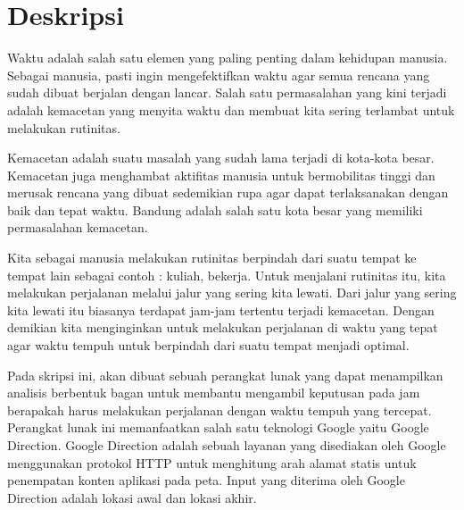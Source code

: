 \documentclass[a4paper,twoside]{article}
\begin{document}
\title{\@judultopik}
\author{\nama \textendash \@npm} 

\newcommand{\nama}{Frasetiawan Hidayat}
\newcommand{\@npm}{2010730121}
\newcommand{\@judultopik}{Analisis Waktu Tempuh Kota Bandung} %
\newcommand{\jumpemb}{1} %
\newcommand{\tanggal}{16/01/2017}
\maketitle


\section{Deskripsi}
Waktu adalah salah satu elemen yang paling penting dalam kehidupan manusia. Sebagai manusia, pasti ingin mengefektifkan waktu agar semua rencana yang sudah dibuat berjalan dengan lancar. Salah satu permasalahan yang kini terjadi adalah kemacetan yang menyita waktu dan membuat kita sering terlambat untuk melakukan rutinitas.

Kemacetan adalah suatu masalah yang sudah lama terjadi di kota-kota besar. Kemacetan juga menghambat aktifitas manusia untuk bermobilitas tinggi dan merusak rencana yang dibuat sedemikian rupa agar dapat terlaksanakan dengan baik dan tepat waktu. Bandung adalah salah satu kota besar yang memiliki permasalahan kemacetan. 

Kita sebagai manusia melakukan rutinitas berpindah dari suatu tempat ke tempat lain sebagai contoh : kuliah, bekerja. Untuk menjalani rutinitas itu, kita melakukan perjalanan melalui jalur yang sering kita lewati. Dari jalur yang sering kita lewati itu biasanya terdapat jam-jam tertentu terjadi kemacetan. Dengan demikian kita menginginkan untuk melakukan perjalanan di waktu yang tepat agar waktu tempuh untuk berpindah dari suatu tempat menjadi optimal.

Pada skripsi ini, akan dibuat sebuah perangkat lunak yang dapat menampilkan analisis berbentuk bagan untuk membantu mengambil keputusan pada jam berapakah harus melakukan perjalanan dengan waktu tempuh yang tercepat. Perangkat lunak ini memanfaatkan salah satu teknologi Google yaitu Google Direction. Google Direction adalah sebuah layanan yang disediakan oleh Google menggunakan protokol HTTP untuk menghitung arah alamat statis untuk penempatan konten aplikasi pada peta. Input yang diterima oleh Google Direction adalah lokasi awal dan lokasi akhir.
\end{document}
